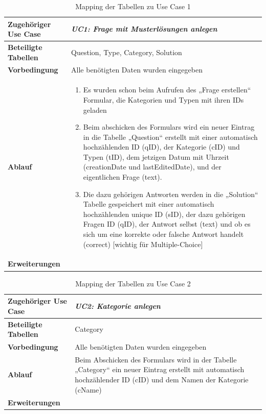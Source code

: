 \begin{table}[h]
	\begin{tabular}{|p{3cm}|p{11.06cm}|}
	\hline
		\textbf{Zugehöriger Use Case}                 &   \emph{UC1: Frage mit Musterlösungen anlegen} \prettyref{uc:UC1}     \\ \hline
		\textbf{Beteiligte Tabellen}      &     Question, Type, Category, Solution    \\ \hline
		\textbf{Vorbedingung}              &     Alle benötigten Daten wurden eingegeben    \\ \hline
		\textbf{Ablauf}              &   
			\begin{enumerate}
			  \item Es wurden schon beim Aufrufen des „Frage erstellen“ Formular, die Kategorien und Typen mit ihren IDs geladen
			  \item Beim abschicken des Formulars wird ein neuer Eintrag in die Tabelle „Question“ erstellt mit einer automatisch hochzählenden ID (qID), der Kategorie (cID) und Typen (tID), dem jetzigen Datum mit Uhrzeit (creationDate und lastEditedDate), und der eigentlichen Frage (text).
			  \item Die dazu gehörigen Antworten werden in die „Solution“ Tabelle gespeichert mit einer automatisch hochzählenden unique ID (sID), der dazu gehörigen Fragen ID (qID), der Antwort selbst (text) und ob es sich um eine korrekte oder falsche Antwort handelt (correct) [wichtig für Multiple-Choice]
			\end{enumerate}
		\\ \hline
		\textbf{Erweiterungen}              &        \\ \hline 
	\end{tabular}
	\caption{Mapping der Tabellen zu Use Case 1}
\end{table}\FloatBarrier

\begin{table}[h] 
	\begin{tabular}{|p{3cm}|p{11.06cm}|}
	\hline
		\textbf{Zugehöriger Use Case}                 &     \emph{UC2: Kategorie anlegen} \prettyref{uc:UC2}    \\ \hline
		\textbf{Beteiligte Tabellen}      &     Category    \\ \hline
		\textbf{Vorbedingung}              &    Alle benötigten Daten wurden eingegeben     \\ \hline
		\textbf{Ablauf}              &    Beim Abschicken des Formulars wird in der Tabelle „Category“ ein neuer Eintrag erstellt mit automatisch hochzählender ID (cID) und dem Namen der Kategorie (cName)
		\\ \hline
		\textbf{Erweiterungen}              &         \\ \hline
	\end{tabular}
	\caption{Mapping der Tabellen zu Use Case 2}
\end{table}\FloatBarrier

